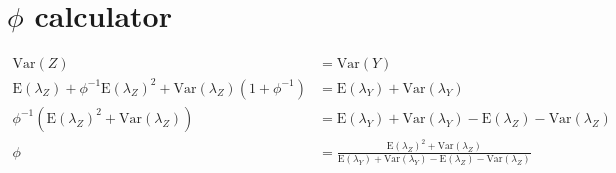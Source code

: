 \documentclass{article}
\begin{document}
\section{$\phi$ calculator}



\begin{align*}
\text{Var}\left(Z\right) & = \text{Var}\left(Y\right) \\
\text{E}\left(\lambda_{Z}\right) + \phi^{-1}\text{E}\left(\lambda_{Z}\right)^2 + \text{Var}\left(\lambda_{Z}\right)\left(1 + \phi^{-1}\right) & =
  \text{E}\left(\lambda_{Y}\right) +
  \text{Var}\left(\lambda_{Y}\right) \\
\phi^{-1}\left(\text{E}\left(\lambda_{Z}\right)^2 +  \text{Var}\left(\lambda_{Z}\right)\right) & =
\text{E}\left(\lambda_{Y}\right) +
\text{Var}\left(\lambda_{Y}\right) -
\text{E}\left(\lambda_{Z}\right) -
\text{Var}\left(\lambda_{Z}\right) \\
\phi & = \frac{\text{E}\left(\lambda_{Z}\right)^2 +  \text{Var}\left(\lambda_{Z}\right)}{\text{E}\left(\lambda_{Y}\right) +
\text{Var}\left(\lambda_{Y}\right) -
\text{E}\left(\lambda_{Z}\right) -
\text{Var}\left(\lambda_{Z}\right)}
\end{align*}
\end{document}
